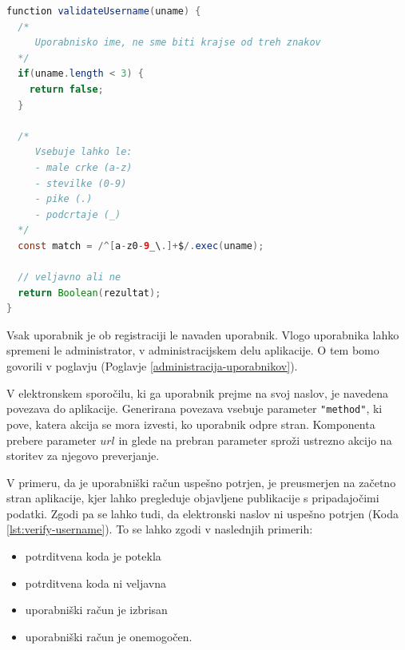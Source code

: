 \clearpage

\begin{lstlisting}[language=java, style=mystyle, 
    caption={Primer validacijske funkcije za preverjanje uporabniškega imena z uporabo regularnega izraza.},label=lst:validation]
function validateUsername(uname) {
  /*
     Uporabnisko ime, ne sme biti krajse od treh znakov
  */
  if(uname.length < 3) {
    return false;
  }

  /*
     Vsebuje lahko le:
     - male crke (a-z)
     - stevilke (0-9)
     - pike (.)
     - podcrtaje (_)
  */
  const match = /^[a-z0-9_\.]+$/.exec(uname);

  // veljavno ali ne
  return Boolean(rezultat);
}
\end{lstlisting}

Vsak uporabnik je ob registraciji le navaden uporabnik. Vlogo uporabnika lahko spremeni le administrator, v administracijskem delu aplikacije. O tem bomo govorili v poglavju  (Poglavje \ref{administracija-uporabnikov}).

V elektronskem sporočilu, ki ga uporabnik prejme na svoj naslov, je navedena povezava do aplikacije. Generirana povezava vsebuje parameter \verb="method"=, ki pove, katera akcija se mora izvesti, ko uporabnik odpre stran. Komponenta prebere parameter $url$ in glede na prebran parameter sproži ustrezno akcijo na storitev za njegovo preverjanje.

V primeru, da je uporabniški račun uspešno potrjen, je preusmerjen na začetno stran aplikacije, kjer lahko pregleduje objavljene publikacije s pripadajočimi podatki. Zgodi pa se lahko tudi, da elektronski naslov ni uspešno potrjen (Koda \ref{lst:verify-username}). To se lahko zgodi v naslednjih primerih:
\begin{itemize}
\item potrditvena koda je potekla
\item potrditvena koda ni veljavna
\item uporabniški račun je izbrisan
\item uporabniški račun je onemogočen.
\end{itemize}

